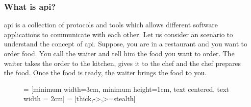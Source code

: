 \subsubsection{What is \acrshort{api}?}
\acrshort{api} is a collection of protocols and tools which allows different software applications to communicate with each other. Let us consider an scenario
to understand the concept of \acrshort{api}. Suppose, you are in a restaurant and you want to order food. You call the waiter and tell him the food you want 
to order. The waiter takes the order to the kitchen, gives it to the chef and the chef prepares the food. Once the food is ready, the waiter brings the food
to you.
\begin{figure}[!ht]
  \centering
   = [minimum width=3cm, minimum height=1cm, text centered, text width = 2cm]
   = [thick,->,>=stealth]
\end{figure}
